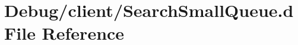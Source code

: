 \hypertarget{SearchSmallQueue_8d}{\section{Debug/client/\-Search\-Small\-Queue.d File Reference}
\label{SearchSmallQueue_8d}
}
